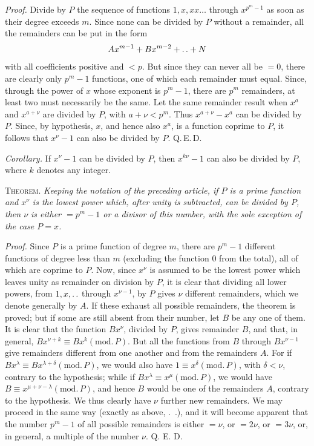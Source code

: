 \emph{Proof.} Divide by $P$ the sequence of functions $1,x,xx\ldots$ through $x^{p^m-1}$ as soon as their degree exceeds $m$. Since none can be divided by $P$ without a remainder, all the remainders can be put in the form
\[
Ax^{m-1}+Bx^{m-2}+\mathinner{.\,.}+N
\]
with all coefficients positive and $<p$. But since they can never all be $=0$, there are clearly only $p^m-1$ functions, one of which each remainder must equal. Since, through the power of $x$ whose exponent is $p^m-1$, there are $p^m$ remainders, at least two must necessarily be the same. Let the same remainder result when $x^a$ and $x^{a+\nu}$ are divided by $P$, with $a+\nu<p^m$. Thus $x^{a+\nu}-x^a$ can be divided by $P$. Since, by hypothesis, $x$, and hence also $x^a$, is a function coprime to $P$, it follows that $x^\nu-1$ can also be divided by $P$. Q.\,E.\,D.

\emph{Corollary.} If $x^\nu-1$ can be divided by $P$, then $x^{k\nu}-1$ can also be divided by $P$, where $k$ denotes any integer.

\textsc{Theorem.} \emph{Keeping the notation of the preceding article, if $P$ is a prime function and $x^\nu$ is the lowest power which, after unity is subtracted, can be divided by $P$, then $\nu$ is either $=p^m-1$ or a divisor of this number, with the sole exception of the case $P=x$.}

\emph{Proof.} Since $P$ is a prime function of degree $m$, there are $p^m-1$ different functions of degree less than $m$ (excluding the function $0$ from the total), all of which are coprime to $P$. Now, since $x^\nu$ is assumed to be the lowest power which leaves unity as remainder on division by $P$, it is clear that dividing all lower powers, from $1,x,\mathinner{.\,.}$ through $x^{\nu-1}$, by $P$ gives $\nu$ different remainders, which we denote generally by $A$. If these exhaust all possible remainders, the theorem is proved; but if some are still absent from their number, let $B$ be any one of them. It is clear that the function $Bx^\nu$, divided by $P$, gives remainder $B$, and that, in general, $Bx^{\nu+k}\equiv Bx^k(\mathrm{mod.}\,P)$. But all the functions from $B$ through $Bx^{\nu-1}$
give remainders different from one another and from the remainders $A$. For if $Bx^\lambda\equiv Bx^{\lambda+\delta}(\mathrm{mod.}\,P)$, we would also have $1\equiv x^\delta(\mathrm{mod.}\,P)$, with $\delta<\nu$, contrary to the hypothesis; while if $Bx^\lambda\equiv x^\mu(\mathrm{mod.}\,P)$, we would have $B\equiv x^{\mu+\nu-\lambda}(\mathrm{mod.}\,P)$, and hence $B$ would be one of the remainders $A$, contrary to the hypothesis. We thus clearly have $\nu$ further new remainders. We may proceed in the same way (exactly as above, \textsection.\ .), and it will become apparent that the number $p^m-1$ of all possible remainders is either $=\nu$, or $=2\nu$, or $=3\nu$, or, in general, a multiple of the number $\nu$. Q. E. D.

